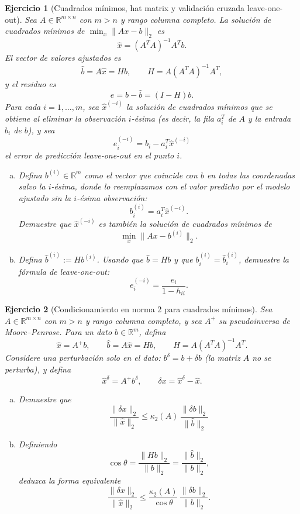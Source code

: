 \documentclass[12pt]{article}
\newtheorem{exercise}{Ejercicio}
\begin{document}
\begin{exercise}[Cuadrados mínimos, hat matrix y validación cruzada leave-one-out]
Sea $A \in \mathbb{R}^{m \times n}$ con $m > n$ y rango columna completo. La solución de cuadrados mínimos de $\min_x \|Ax - b\|_2$ es
\[
\hat{x} = (A^TA)^{-1}A^Tb.
\]
El vector de valores ajustados es
\[
\hat{b} = A\hat{x} = Hb, \qquad H = A(A^TA)^{-1}A^T,
\]
y el residuo es
\[
e = b - \hat{b} = (I-H)b.
\]
Para cada $i = 1, \ldots, m$, sea $\hat{x}^{(-i)}$ la solución de cuadrados mínimos que se obtiene al eliminar la observación $i$-ésima (es decir, la fila $a_i^T$ de $A$ y la entrada $b_i$ de $b$), y sea
\[
e_i^{(-i)} = b_i - a_i^T \hat{x}^{(-i)}
\]
el \emph{error de predicción leave-one-out} en el punto $i$.

\begin{enumerate}[(a)]
\item Defina $b^{(i)} \in \mathbb{R}^m$ como el vector que coincide con $b$ en todas las coordenadas salvo la $i$-ésima, donde lo reemplazamos con el valor predicho por el modelo ajustado sin la $i$-ésima observación:
\[
b_i^{(i)} = a_i^T \hat{x}^{(-i)}.
\]
Demuestre que $\hat{x}^{(-i)}$ es también la solución de cuadrados mínimos de
\[
\min_x \|Ax - b^{(i)}\|_2.
\]

\item Defina $\hat{b}^{(i)} := H b^{(i)}$. Usando que $\hat{b}=Hb$ y que $b_i^{(i)}=\hat{b}_i^{(i)}$, demuestre la fórmula de leave-one-out:
\[
e_i^{(-i)} = \frac{e_i}{1 - h_{ii}}.
\]
\end{enumerate}
\end{exercise}


\begin{exercise}[Condicionamiento en norma 2 para cuadrados mínimos]
Sea $A \in \mathbb{R}^{m\times n}$ con $m>n$ y rango columna completo, y sea $A^+$ su pseudoinversa de Moore--Penrose. Para un dato $b\in\mathbb{R}^m$, defina
\[
\hat{x}=A^+b,
\qquad
\hat{b}=A\hat{x}=Hb,
\qquad
H=A(A^TA)^{-1}A^T.
\]
Considere una perturbación solo en el dato: $b^{\delta}=b+\delta b$ (la matriz $A$ no se perturba), y defina
\[
\hat{x}^{\delta}=A^+b^{\delta},
\qquad
\delta x=\hat{x}^{\delta}-\hat{x}.
\]

\begin{enumerate}[(a)]
\item Demuestre que
\[
\frac{\|\delta x\|_2}{\|\hat{x}\|_2}
\le
\kappa_2(A)\,\frac{\|\delta b\|_2}{\|\hat b\|_2}
\]
\item Definiendo
\[
\cos\theta=\frac{\|Hb\|_2}{\|b\|_2}=\frac{\|\hat b\|_2}{\|b\|_2},
\]
deduzca la forma equivalente
\[
\frac{\|\delta x\|_2}{\|\hat{x}\|_2}
\le
\frac{\kappa_2(A)}{\cos\theta}\,\frac{\|\delta b\|_2}{\|b\|_2}.
\]
\end{enumerate}
\end{exercise}
\end{document}
